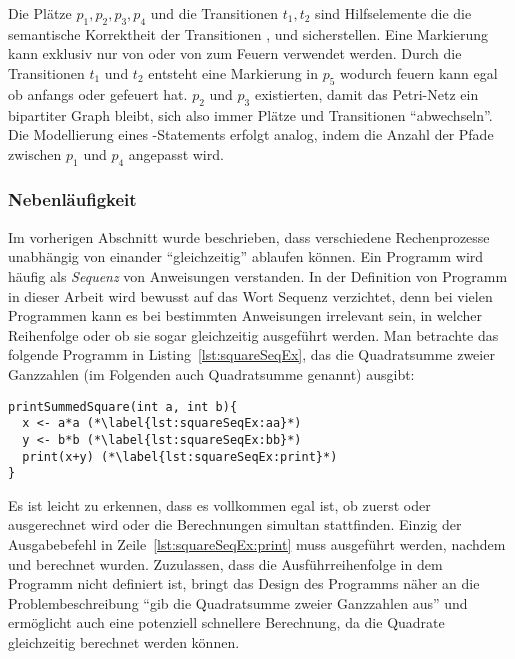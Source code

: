Die Plätze $p_1,p_2,p_3,p_4$ und die Transitionen $t_1,t_2$ sind Hilfselemente die die semantische Korrektheit der Transitionen ,  und  sicherstellen. Eine Markierung kann exklusiv nur von  oder von  zum Feuern verwendet werden. Durch die Transitionen $t_1$ und $t_2$ entsteht eine Markierung in $p_5$ wodurch  feuern kann egal ob anfangs  oder  gefeuert hat. $p_2$ und $p_3$ existierten, damit das Petri-Netz ein bipartiter Graph bleibt, sich also immer Plätze und Transitionen \enquote{abwechseln}. Die Modellierung eines -Statements erfolgt analog, indem die Anzahl der Pfade zwischen $p_1$ und $p_4$ angepasst wird.

\subsubsection{Nebenläufigkeit}\label{sec:nebenl}
Im vorherigen Abschnitt wurde beschrieben, dass verschiedene Rechenprozesse unabhängig von einander \enquote{gleichzeitig} ablaufen können. Ein Programm wird häufig als \emph{Sequenz} von Anweisungen verstanden. In der Definition von Programm in dieser Arbeit wird bewusst auf das Wort Sequenz verzichtet, denn bei vielen Programmen kann es bei bestimmten Anweisungen irrelevant sein, in welcher Reihenfolge oder ob sie sogar gleichzeitig ausgeführt werden. Man betrachte das folgende Programm in Listing~\vref{lst:squareSeqEx}, das die Quadratsumme zweier Ganzzahlen (im Folgenden auch Quadratsumme genannt) ausgibt: 
\begin{lstlisting}[caption={Beispiel eines Programms das die Summe von Quadraten zweier Ganzzahlen berechnet. Die Berechnung der Quadratzahlen wird nacheinander in einer fest definierten Sequenz durchgeführt.}, label={lst:squareSeqEx}]
printSummedSquare(int a, int b){
  x <- a*a (*\label{lst:squareSeqEx:aa}*)
  y <- b*b (*\label{lst:squareSeqEx:bb}*)
  print(x+y) (*\label{lst:squareSeqEx:print}*)
}
\end{lstlisting}
Es ist leicht zu erkennen, dass es vollkommen egal ist, ob zuerst  oder  ausgerechnet wird oder die Berechnungen simultan stattfinden. Einzig der Ausgabebefehl in Zeile~\ref{lst:squareSeqEx:print} muss ausgeführt werden, nachdem  und  berechnet wurden. Zuzulassen, dass die Ausführreihenfolge in dem Programm nicht definiert ist, bringt das Design des Programms näher an die Problembeschreibung \enquote{gib die Quadratsumme zweier Ganzzahlen aus} und ermöglicht auch eine potenziell schnellere Berechnung, da die Quadrate gleichzeitig berechnet werden können.

